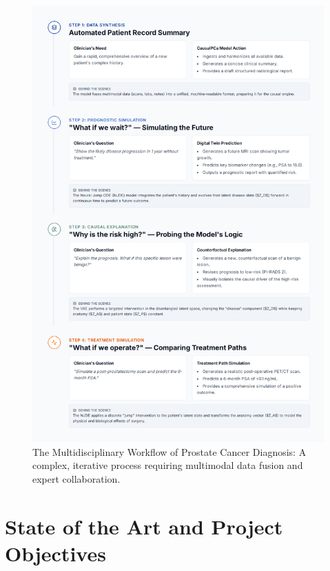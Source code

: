 \documentclass[11pt, a4paper]{article}
\begin{document}
\begin{figure}[H]
    \centering
    \includegraphics[width=1\textwidth]{wf.png}
    \caption{The Multidisciplinary Workflow of Prostate Cancer Diagnosis: A complex, iterative process requiring multimodal data fusion and expert collaboration.}
    \label{fig:workflow}
\end{figure}

\section{State of the Art and Project Objectives}
\end{document}
